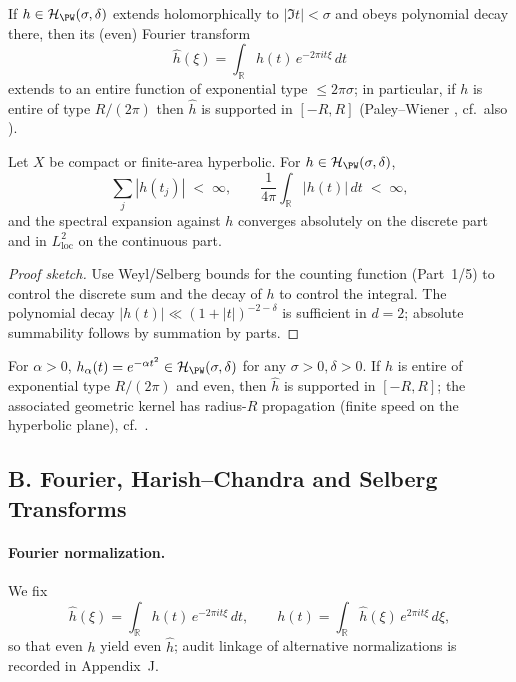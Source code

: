 \begin{remark}
If $h\in \mathcal H_{\PW}(\sigma,\delta)$ extends holomorphically to $|\Im t|<\sigma$ and obeys polynomial decay there, then its (even) Fourier transform
\[
  \hat h(\xi)=\int_{\mathbb R} h(t)\,e^{-2\pi i t \xi}\,dt
\]
extends to an entire function of exponential type $\le 2\pi \sigma$; in particular, if $h$ is entire of type $R/(2\pi)$ then $\hat h$ is supported in $[-R,R]$ (Paley–Wiener \cite{PaleyWiener1934}, cf.\ also \cite[Ch.~IV]{HelgasonGGA}).
\end{remark}

\begin{lemma}
\label{lem:spectral-conv}
Let $X$ be compact or finite-area hyperbolic. For $h\in\mathcal H_{\PW}(\sigma,\delta)$,
\[
  \sum_j |h(t_j)| \;<\;\infty,
  \qquad
  \frac{1}{4\pi}\int_{\mathbb R} |h(t)|\,dt \;<\;\infty,
\]
and the spectral expansion against $h$ converges absolutely on the discrete part and in $L^2_{\mathrm{loc}}$ on the continuous part.
\end{lemma}

\begin{proof}[Proof sketch]
Use Weyl/Selberg bounds for the counting function (Part~1/5) to control the discrete sum and the decay of $h$ to control the integral. The polynomial decay $|h(t)|\ll (1+|t|)^{-2-\delta}$ is sufficient in $d=2$; absolute summability follows by summation by parts.
\end{proof}

\begin{example}
For $\alpha>0$, $h_\alpha(t)=e^{-\alpha t^2}\in\mathcal H_{\PW}(\sigma,\delta)$ for any $\sigma>0,\delta>0$. If $h$ is entire of exponential type $R/(2\pi)$ and even, then $\hat h$ is supported in $[-R,R]$; the associated geometric kernel has radius-$R$ propagation (finite speed on the hyperbolic plane), cf.\ \cite{HelgasonGGA,Hejhal1983}.
\end{example}


\subsection*{B. Fourier, Harish–Chandra and Selberg Transforms}
\label{subsec:transforms}

\paragraph{Fourier normalization.}
We fix
\[
  \hat h(\xi)=\int_{\mathbb R} h(t)\,e^{-2\pi i t \xi}\,dt,
  \qquad
  h(t)=\int_{\mathbb R} \hat h(\xi)\,e^{2\pi i t \xi}\,d\xi,
\]
so that even $h$ yield even $\hat h$; audit linkage of alternative normalizations is recorded in Appendix~J.

